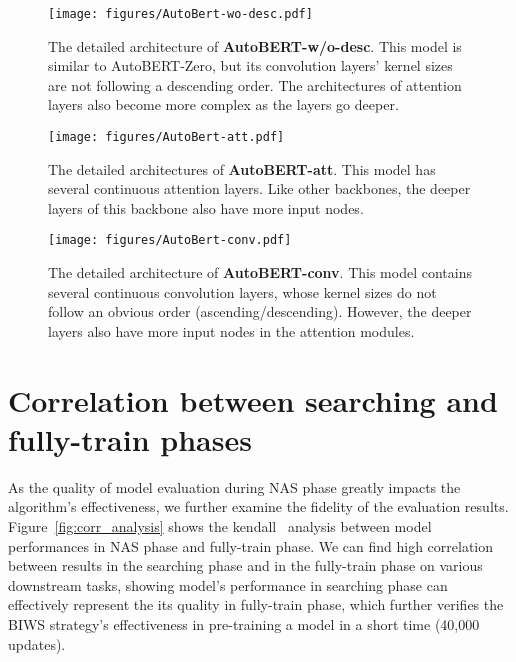 \documentclass[letterpaper]{article} \usepackage{aaai22}  \usepackage{times}  \usepackage{helvet}  \usepackage{courier}  \usepackage[hyphens]{url}  \usepackage{graphicx} \urlstyle{rm} \def\UrlFont{\rm}  \usepackage{natbib}  \usepackage{caption} \DeclareCaptionStyle{ruled}{labelfont=normalfont,labelsep=colon,strut=off} \frenchspacing  \setlength{\pdfpagewidth}{8.5in}  \setlength{\pdfpageheight}{11in}  \usepackage{algorithm}
\begin{document}
\begin{figure*}[t]
\begin{minipage}[c]{\textwidth}
\centering
\texttt{[image: figures/AutoBert-wo-desc.pdf]}
\caption{The detailed architecture of \textbf{AutoBERT-w/o-desc}. This model is similar to AutoBERT-Zero, but its convolution layers' kernel sizes are not following a descending order. The architectures of attention layers also become more complex as the layers go deeper.}
	\label{fig:autobert-zero-wo-desc}
\end{minipage}
\begin{minipage}[c]{\textwidth}
\centering
\texttt{[image: figures/AutoBert-att.pdf]}
\caption{The detailed architectures of \textbf{AutoBERT-att}. This model has several continuous attention layers. Like other backbones, the deeper layers of this backbone also have more input nodes.}
	\label{fig:autobert-att}
\end{minipage}
\end{figure*}

\begin{figure*}[h]
\centering
\texttt{[image: figures/AutoBert-conv.pdf]}
\caption{The detailed architecture of \textbf{AutoBERT-conv}. This model contains several continuous convolution layers, whose kernel sizes do not follow an obvious order (ascending/descending). However, the deeper layers also have more input nodes in the attention modules.}
	\label{fig:autobert-conv}
\end{figure*}

\section{Correlation between searching and fully-train phases}
As the quality of model evaluation during NAS phase greatly impacts the algorithm’s effectiveness, we further examine the fidelity of the evaluation results. Figure~\ref{fig:corr_analysis} shows the kendall~\citep{kendall} analysis between model performances in NAS phase and fully-train phase.   We can find high correlation between results in the searching phase and in the fully-train phase on various downstream tasks, showing model's performance in searching phase can effectively represent the its 
quality in fully-train phase, which further verifies the BIWS strategy's effectiveness in pre-training a model in a short time (40,000 updates).
\end{document}
